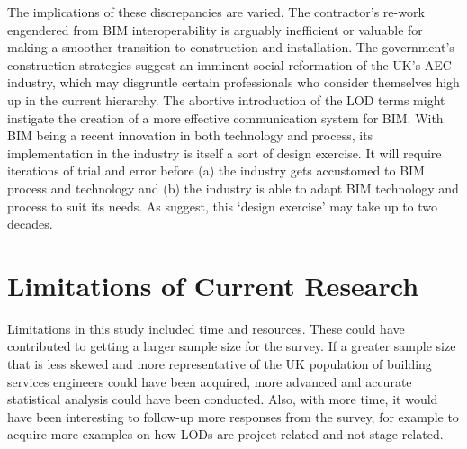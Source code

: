 The implications of these discrepancies are varied.
The contractor's re-work engendered from BIM interoperability is arguably inefficient or valuable for making a smoother transition to construction and installation.
The government's construction strategies suggest an imminent social reformation of the UK's AEC industry, which may disgruntle certain professionals who consider themselves high up in the current hierarchy.
The abortive introduction of the LOD terms might instigate the creation of a more effective communication system for BIM.
With BIM being a recent innovation in both technology and process, its implementation in the industry is itself a sort of design exercise.
It will require iterations of trial and error before (a) the industry gets accustomed to BIM process and technology and (b) the industry is able to adapt BIM technology and process to suit its needs.
As \cite{Miettinen2014} suggest, this `design exercise' may take up to two decades.


\section{Limitations of Current Research}

Limitations in this study included time and resources.
These could have contributed to getting a larger sample size for the survey.
If a greater sample size that is less skewed and more representative of the UK population of building services engineers could have been acquired, more advanced and accurate statistical analysis could have been conducted.
Also, with more time, it would have been interesting to follow-up more responses from the survey, for example to acquire more examples on how LODs are project-related and not stage-related.


